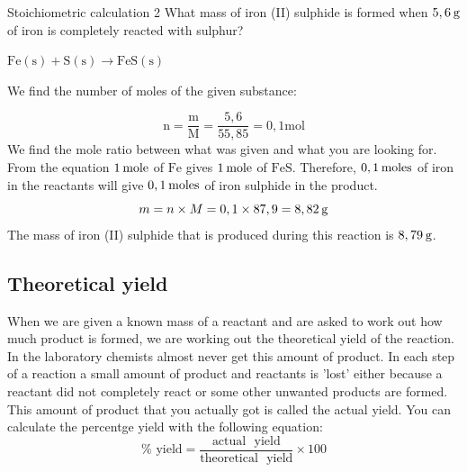       \begin{wex}{Stoichiometric calculation 2 }
{
      \label{m38712*probfhsst!!!underscore!!!id1973}
      \label{m38712*id284347}What mass of iron (II) sulphide is formed when $5,6\phantom{\rule{2pt}{0ex}}\text{g}$ of iron is completely reacted with sulphur?
      \vspace{5pt} }
{
      \label{m38712*id284378}$\text{Fe}\left(\text{s}\right)+\text{S}\left(\text{s}\right)\to \text{FeS}\left(\text{s}\right)$
       
       We find the number of moles of the given substance:  
      \label{m38712*id284430}\nopagebreak\noindent{}
        
    \begin{equation*}
    \text{n}=\frac{\text{m}}{\text{M}}=\frac{5,6}{55,85}=0,1\text{mol}
      \end{equation*}
       We find the mole ratio between what was given and what you are looking for. From the equation $1\phantom{\rule{2pt}{0ex}}\text{mole}$ of $\text{Fe}$ gives $1\phantom{\rule{2pt}{0ex}}\text{mole}$ of $\text{FeS}$. Therefore, $0,1\phantom{\rule{2pt}{0ex}}\text{moles}$ of iron in the reactants will give $0,1\phantom{\rule{2pt}{0ex}}\text{moles}$ of iron sulphide in the product. 
      \label{m38712*id284499}\nopagebreak\noindent{}
    \begin{equation*}
    m=n\ensuremath{\times}M=0,1\ensuremath{\times}87,9=8,82\phantom{\rule{2pt}{0ex}}\text{g}
      \end{equation*}
      \label{m38712*id284548}The mass of iron (II) sulphide that is produced during this reaction is $8,79\phantom{\rule{2pt}{0ex}}\text{g}$. 
}
    \end{wex}
    \noindent \vspace{-1cm}
\subsection*{Theoretical yield}
\label{m38712*eip-943}When we are given a known mass of a reactant and are asked to work out how much product is formed, we are working out the theoretical yield of the reaction. In the laboratory chemists almost never get this amount of product. In each step of a reaction a small amount of product and reactants is 'lost' either because a reactant did not completely react or some other unwanted products are formed. This amount of product that you actually got is called the actual yield. You can calculate the percentge yield with the following equation:
\begin{equation*}
 \text{\% ~yield} = \frac{\text{actual ~yield}}{\text{theoretical ~yield}} \times 100
\end{equation*}

